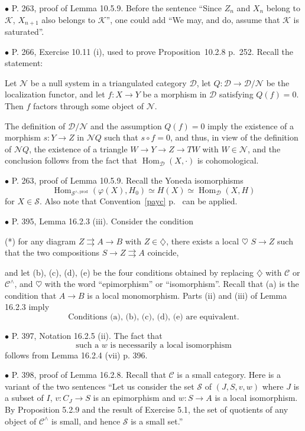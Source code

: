 \documentclass[12pt]{article}
\theoremstyle{remark}%
\newcommand{\bu}{\bullet}
\newcommand{\n}{\noindent}
\newcommand{\cc}{\mathcal}
\newcommand{\C}{\mathcal C}
\newcommand{\p}{\varphi}
\newcommand{\pa}{\rightrightarrows}
\newcommand{\be}{\begin{equation}}
\newcommand{\ee}{\end{equation}}
\newcommand{\pr}{Proposition}
\DeclareMathOperator{\h}{Hom}
\begin{document}

\n$\bu$ P. 263, proof of Lemma 10.5.9. Before the sentence ``Since $Z_n$  and $X_n$ belong to $\cc K$, $X_{n+1}$ also belongs to $\cc K$'', one could add ``We may, and do, assume that $\cc K$ is saturated''. 


\n$\bu$ P. 266, Exercise 10.11 (i), used to prove \pr\ 10.2.8 p.~252. Recall the statement: 

Let $\cc N$ be a null system in a triangulated category $\cc D$, let $Q:\cc D\to\cc D/\cc N$ be the localization functor, and let $f:X\to Y$ be a morphism in $\cc D$ satisfying $Q(f)=0$. Then $f$ factors through some object of $\cc N$. 

\n{\em Proof.} The definition of $\cc D/\cc N$ and the assumption $Q(f)=0$ imply the existence of a morphism $s:Y\to Z$ in $\cc NQ$ such that $s\circ f=0$, and thus, in view of the definition of $\cc NQ$, the existence of a triangle $W\to Y\to Z\to TW$ with $W\in\cc N$, and the conclusion follows from the fact that $\h_{\cc D}(X,\cdot)$ is cohomological.


\n$\bu$ P. 263, proof of Lemma 10.5.9. Recall the Yoneda isomorphisms 
$$
\h_{\cc S^{\wedge,\text{prod}}}(\p(X),H_0)\simeq H(X)\simeq\h_{\cc D}(X,H)
$$ 
for $X\in\cc S$. Also note that Convention~\ref{payc} p.~\pageref{payc} can be applied. 


\n$\bu$ P. 395, Lemma 16.2.3 (iii). Consider the condition 

\n(*) for any diagram $Z\pa A\to B$ with $Z\in\diamondsuit$, there exists a local $\heartsuit$ $S\to Z$ such that the two compositions $S\to Z\pa A$ coincide, 

\n and let (b), (c), (d), (e) be the four conditions obtained by replacing $\diamondsuit$ with $\C$ or $\C^\wedge$, and $\heartsuit$ with the word ``epimorphism'' or ``isomorphism''. Recall that (a) is the condition that $A\to B$ is a local monomorphism. Parts (ii) and (iii) of Lemma 16.2.3 imply 
%
\be\label{1623}
\text{Conditions (a), (b), (c), (d), (e) are equivalent.}
\ee

\n$\bu$ P. 397, Notation 16.2.5 (ii). The fact that 
\be\label{1625}
\text{such a $w$ is necessarily a local isomorphism}
\ee
follows from Lemma 16.2.4 (vii) p. 396. 


\n$\bu$ P. 398, proof of Lemma 16.2.8. Recall that $\C$ is a small category. Here is a variant of the two sentences ``Let us consider the set $\cc S$ of $(J,S,v,w)$ where $J$ is a subset of $I$, $v:C_J\to S$ is an epimorphism and $w:S\to A$ is a local isomorphism. By Proposition 5.2.9 and the result of Exercise 5.1, the set of quotients of any object of $\C^\wedge$ is small, and hence $\cc S$ is a small set.'' 
\end{document}
